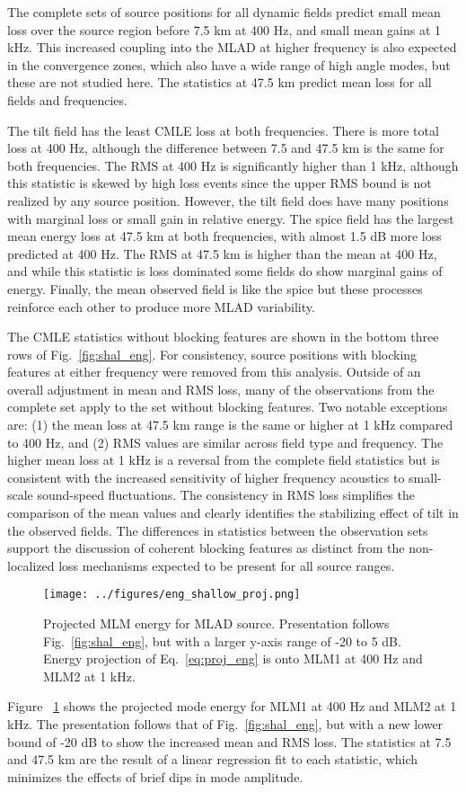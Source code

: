 \documentclass[preprint,NumberedRefs]{JASA}
\begin{document}
The complete sets of source positions for all dynamic fields predict small mean loss over the source region before 7.5 km at 400 Hz, and small mean gains at 1 kHz. This increased coupling into the MLAD at higher frequency is also expected in the convergence zones, which also have a wide range of high angle modes, but these are not studied here. The statistics at 47.5 km predict mean loss for all fields and frequencies.

The tilt field has the least CMLE loss at both frequencies. There is more total loss at 400 Hz, although the difference between 7.5 and 47.5 km is the same for both frequencies. The RMS at 400 Hz is significantly higher than 1 kHz, although this statistic is skewed by high loss events since the upper RMS bound is not realized by any source position. However, the tilt field does have many positions with marginal loss or small gain in relative energy. The spice field has the largest mean energy loss at 47.5 km at both frequencies, with almost 1.5 dB more loss predicted at 400 Hz. The RMS at 47.5 km is higher than the mean at 400 Hz, and while this statistic is loss dominated some fields do show marginal gains of energy. Finally, the mean observed field is like the spice but these processes reinforce each other to produce more MLAD variability.

The CMLE statistics without blocking features are shown in the bottom three rows of Fig.~\ref{fig:shal_eng}. For consistency, source positions with blocking features at either frequency were removed from this analysis. Outside of an overall adjustment in mean and RMS loss, many of the observations from the complete set apply to the set without blocking features. Two notable exceptions are: (1) the mean loss at 47.5 km range is the same or higher at 1 kHz compared to 400 Hz, and (2) RMS values are similar across field type and frequency. The higher mean loss at 1 kHz is a reversal from the complete field statistics but is consistent with the increased sensitivity of higher frequency acoustics to small-scale sound-speed fluctuations. The consistency in RMS loss simplifies the comparison of the mean values and clearly identifies the stabilizing effect of tilt in the observed fields. The differences in statistics between the observation sets support the discussion of coherent blocking features as distinct from the non-localized loss mechanisms expected to be present for all source ranges.

\begin{figure}
\texttt{[image: ../figures/eng\_shallow\_proj.png]}
    \caption{Projected MLM energy for MLAD source. Presentation follows Fig.~\ref{fig:shal_eng}, but with a larger y-axis range of -20 to 5 dB. Energy projection of Eq.~\eqref{eq:proj_eng} is onto MLM1 at 400 Hz and MLM2 at 1 kHz.}
    \label{fig:shal_proj}
\end{figure}
Figure ~\ref{fig:shal_proj} shows the projected mode energy for MLM1 at 400 Hz and MLM2 at 1 kHz. The presentation follows that of Fig.~\ref{fig:shal_eng}, but with a new lower bound of -20 dB to show the increased mean and RMS loss. The statistics at 7.5 and 47.5 km are the result of a linear regression fit to each statistic, which minimizes the effects of brief dips in mode amplitude.
\end{document}
